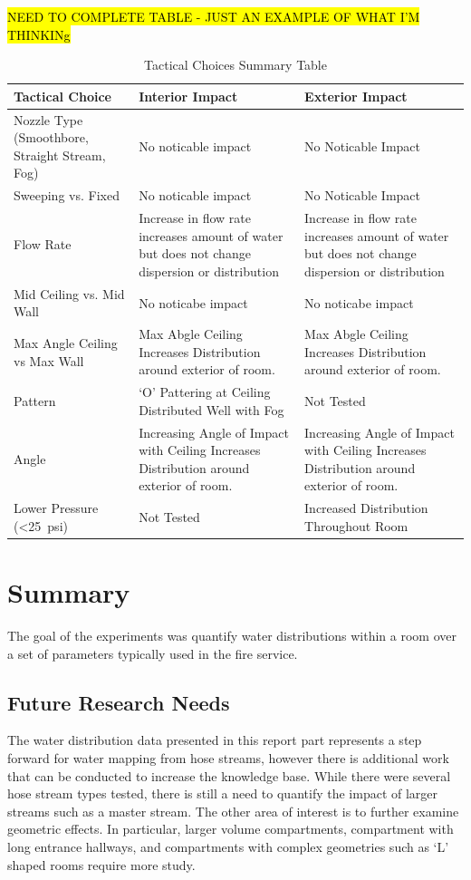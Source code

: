 \documentclass[12pt,oneside]{book}
\begin{document}
\hl{NEED TO COMPLETE TABLE - JUST AN EXAMPLE OF WHAT I'M THINKINg}
\begin{table}[H]
	\centering
	\caption{Tactical Choices Summary Table}
	\begin{tabular}{|L|L|L|}
	\hline
	Tactical Choice & Interior Impact & Exterior Impact \\ \hline \hline
	Nozzle Type (Smoothbore, Straight Stream, Fog) & No noticable impact & No Noticable Impact \\ \hline{}
	Sweeping vs. Fixed & No noticable impact & No Noticable Impact \\ \hline
	Flow Rate & Increase in flow rate increases amount of water but does not change dispersion or distribution & Increase in flow rate increases amount of water but does not change dispersion or distribution \\ \hline
	Mid Ceiling vs. Mid Wall & No noticabe impact & No noticabe impact \\ \hline
	Max Angle Ceiling vs Max Wall & Max Abgle Ceiling Increases Distribution around exterior of room.  & Max Abgle Ceiling Increases Distribution around exterior of room. \\ \hline
	Pattern & `O' Pattering at Ceiling Distributed Well with Fog & Not Tested \\ \hline
	Angle & Increasing Angle of Impact with Ceiling Increases Distribution around exterior of room. & Increasing Angle of Impact with Ceiling Increases Distribution around exterior of room. \\ \hline
	Lower Pressure (<25~psi) & Not Tested & Increased Distribution Throughout Room \\ \hline
	\end{tabular}
\end{table}


\chapter{Summary}

The goal of the experiments was quantify water distributions within a room over a set of parameters typically used in the fire service. 

\section{Future Research Needs}
The water distribution data presented in this report part represents a step forward for water mapping from hose streams, however there is additional work that can be conducted to increase the knowledge base. While there were several hose stream types tested, there is still a need to quantify the impact of larger streams such as a master stream. The other area of interest is to further examine geometric effects. In particular, larger volume compartments, compartment with long entrance hallways, and compartments with complex geometries such as `L' shaped rooms require more study.
\end{document}
